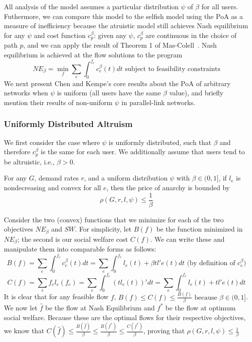 All analysis of the model assumes a particular distribution $\psi$ of $\beta$ for all users. 
Futhermore, we can compare this model to the selfish model using the PoA as a measure of inefficiency
because the atruistic model still achieves Nash equilibrium for any $\psi$ and cost function $c^\beta_p$: given any $\psi$, $c^\beta_p$ are continuous in the choice of path $p$, and we can apply the result of Theorem 1 of Mas-Colell~\cite{mascolell}. Nash equilibrium is achieved at the flow solutions to the program
$$NE_\beta = \min_f\sum_e\int_0^{f_e}c_e^\beta(t)dt \text{ subject to feasibility constraints}$$
We next present Chen and Kempe's core results about the PoA of arbitrary networks when $\psi$ is uniform (all users have the same $\beta$ value), and briefly mention their results of non-uniform $\psi$ in parallel-link networks.

\subsubsection{Uniformly Distributed Altruism}
We first consider the case where $\psi$ is uniformly distributed, such that $\beta$ and therefore $c^\beta_p$ is the same for each user. We additionally assume that users tend to be altruistic, i.e., $\beta > 0$.
\begin{theorem}
For any $G$, demand rates $r$, and 
a uniform distribution $\psi$ with $\beta \in (0, 1]$,
if $l_e$ is nondecreasing and convex for all $e$, then the price of anarchy is bounded by 
    $$\rho(G,r,l,\psi) \le \frac{1}{\beta}$$
\end{theorem}

\begin{proof-sketch}
    Consider the two (convex) functions that we minimize for each of the two objectives $NE_\beta$ and $SW$. For simplicity, let $B(f)$ be the function minimized in $NE_\beta$; the second is our social welfare cost $C(f)$.
    We can write these and manipulate them into comparable forms as follows:
    $$B(f) = \sum_e\int_0^{{f}_e}c_e^\beta(t)dt = 
        \sum_e\int_0^{{f}_e} l_e(t) + \beta tl'e(t)dt\text{ (by definition of $c^\beta_e$)}$$
    $$C(f) = \sum_ef_el_e(f_e) = \sum_e\int_0^{f_e} (tl_e(t))' dt 
        = \sum_e\int_0^{f_e} l_e(t) + tl'e(t)dt$$ 
    It is clear that for any feasible flow $f$, 
    $B(f) \le C(f) \le \frac{B(f)}{\beta} \text{ because $\beta\in(0,1]$}$.
    We now let $\hat{f}$ be the flow at Nash Equilibrium and $f^*$ be the flow at optimum social welfare. Because these are the optimal flows for their respective objectives, we know that 
    $C(\hat{f}) \le \frac{B(\hat{f})}{\beta} \le \frac{B(f^*)}{\beta} \le \frac{C(f^*)}{\beta}$,
    proving that 
    $\rho(G,r,l,\psi) \le \frac{1}{\beta}$
\end{proof-sketch}

